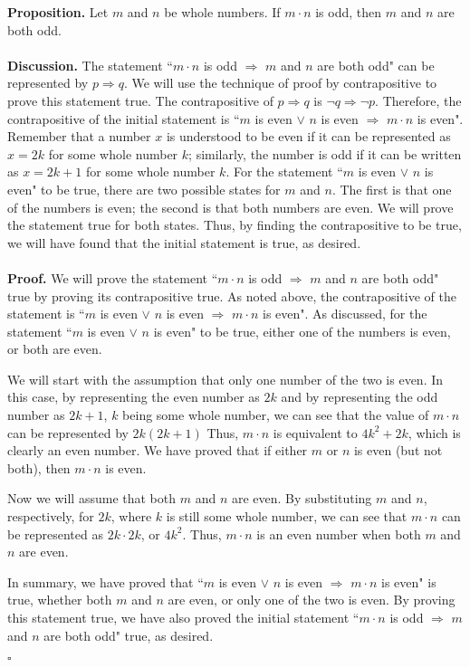\documentclass[12pt]{exam}
\begin{document}
\begin{questions}
\question
\textbf{Proposition.} Let $m$ and $n$ be whole numbers. If $m\cdot n$ is odd, then $m$ and $n$ are both odd.
\\
\\\textbf{Discussion.} The statement ``$m\cdot n$ is odd $\Rightarrow$ $m$ and $n$ are both odd" can be represented by $p\Rightarrow q$. We will use the technique of proof by contrapositive to prove this statement true. The contrapositive of $p\Rightarrow q$ is $\neg q \Rightarrow \neg p$. Therefore, the contrapositive of the initial statement is ``$m$ is even $\vee$ $n$ is even $\Rightarrow$ $m\cdot n$ is even". Remember that a number $x$ is understood to be even if it can be represented as $x=2k$ for some whole number $k$; similarly, the number is odd if it can be written as $x=2k+1$ for some whole number $k$. For the statement ``$m$ is even $\vee$ $n$ is even" to be true, there are two possible states for $m$ and $n$. The first is that one of the numbers is even; the second is that both numbers are even. We will prove the statement true for both states. Thus, by finding the contrapositive to be true, we will have found that the initial statement is true, as desired.
\\
\\\textbf{Proof.} We will prove the statement ``$m\cdot n$ is odd $\Rightarrow$ $m$ and $n$ are both odd" true by proving its contrapositive true. As noted above, the contrapositive of the statement is ``$m$ is even $\vee$ $n$ is even $\Rightarrow$ $m\cdot n$ is even". As discussed, for the statement ``$m$ is even $\vee$ $n$ is even" to be true, either one of the numbers is even, or both are even.
\par
We will start with the assumption that only one number of the two is even. In this case, by representing the even number as $2k$ and by representing the odd number as $2k+1$, $k$ being some whole number, we can see that the value of $m \cdot n$ can be represented by $2k(2k+1)$ Thus, $m \cdot n$ is equivalent to $4k^2+2k$, which is clearly an even number. We have proved that if either $m$ or $n$ is even (but not both), then $m\cdot n$ is even.
\par 
Now we will assume that both $m$ and $n$ are even. By substituting $m$ and $n$, respectively, for $2k$, where $k$ is still some whole number, we can see that $m\cdot n$ can be represented as $2k \cdot 2k$, or $4k^2$. Thus, $m \cdot n$ is an even number when both $m$ and $n$ are even. 
\par
In summary, we have proved that ``$m$ is even $\vee$ $n$ is even $\Rightarrow$ $m\cdot n$ is even" is true, whether both $m$ and $n$ are even, or only one of the two is even. By proving this statement true, we have also proved the initial statement ``$m\cdot n$ is odd $\Rightarrow$ $m$ and $n$ are both odd" true, as desired.
\begin{flushright}
$\square$
\end{flushright}


\end{questions}
\end{document}
